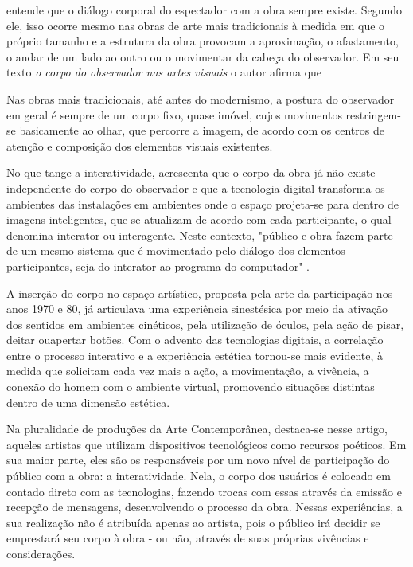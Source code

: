  entende que o diálogo corporal do espectador com a obra sempre existe. Segundo ele, isso ocorre mesmo nas obras de arte mais tradicionais à medida em que o próprio tamanho e a estrutura da obra provocam a aproximação, o afastamento, o andar de um lado ao outro ou o movimentar da cabeça do observador. Em seu texto \textit{o corpo do observador nas artes visuais} o autor afirma que

\begin{citacao}
Nas obras mais tradicionais, até antes do modernismo, a postura do observador em geral é sempre de um corpo fixo, quase imóvel, cujos movimentos restringem-se basicamente ao olhar, que percorre a imagem, de acordo com os centros de atenção e composição dos elementos visuais existentes. \cite{sogabe} 
\end{citacao}

No que tange a interatividade, acrescenta que o corpo da obra já não existe independente do corpo do observador e que a tecnologia digital transforma os ambientes das instalações em ambientes onde o espaço projeta-se para dentro de imagens inteligentes, que se atualizam de acordo com cada participante, o qual denomina interator ou interagente. Neste contexto, "público e obra fazem parte de um mesmo sistema que é movimentado pelo diálogo dos elementos participantes, seja do interator ao programa do computador" .


A inserção do corpo no espaço artístico, proposta pela arte da participação nos
anos 1970 e 80, já articulava uma experiência sinestésica por meio da ativação dos
sentidos em ambientes cinéticos, pela utilização de óculos, pela ação de pisar, deitar ouapertar botões. Com o advento das tecnologias digitais, a correlação entre o processo
interativo e a experiência estética tornou-se mais evidente, à medida que solicitam cada
vez mais a ação, a movimentação, a vivência, a conexão do homem com o ambiente
virtual, promovendo situações distintas dentro de uma dimensão estética. \cite{rabello}



Na pluralidade de produções da Arte Contemporânea, destaca-se nesse artigo, aqueles artistas que utilizam dispositivos tecnológicos como recursos poéticos. Em sua maior parte, eles são os responsáveis por um novo nível de participação do público com a obra: a interatividade. Nela, o corpo dos usuários é colocado em contado direto com as tecnologias, fazendo trocas com essas através da emissão e recepção de mensagens, desenvolvendo o processo da obra. Nessas experiências, a sua realização não é atribuída apenas ao artista, pois o público irá decidir se emprestará seu corpo à obra - ou não, através de suas próprias vivências e considerações. \cite{vares}



